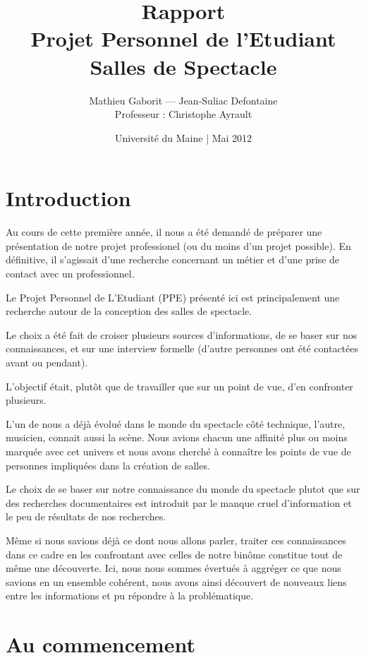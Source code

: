 \documentclass[a4paper, 11pt]{report}
\title{{\Huge Rapport}\\Projet Personnel de l'Etudiant\\
        Salles de Spectacle}
\author{Mathieu Gaborit — Jean-Suliac Defontaine\\Professeur : Christophe Ayrault}
\date{Université du Maine | Mai 2012}
\begin{document}
    \selectfont

    \maketitle
    
    \tableofcontents
    \newpage


\section*{Introduction}

Au cours de cette première année, il nous a été demandé de préparer une présentation de notre projet professionel (ou du moins d'un projet possible).
En définitive, il s'agissait d'une recherche concernant un métier et d'une prise de contact avec un professionnel.

Le Projet Personnel de L'Etudiant (PPE) présenté ici est principalement une recherche autour de la conception des salles de spectacle.

Le choix a été fait de croiser plusieurs sources d'informations, de se baser sur nos connaissances, et sur une interview formelle (d'autre personnes ont été contactées avant ou pendant).

L'objectif était, plutôt que de travailler que sur un point de vue, d'en confronter plusieurs.

L'un de nous a déjà évolué dans le monde du spectacle côté technique, l'autre, musicien, connait aussi la scène.
Nous avions chacun une affinité plus ou moins marquée avec cet univers et nous avons cherché à connaître les points de vue de personnes impliquées dans la création de salles.

Le choix de se baser sur notre connaissance du monde du spectacle plutot que sur des recherches documentaires est introduit par le manque cruel d'information et le peu de résultats de nos recherches.

Même si nous savions déjà ce dont nous allons parler, traiter ces connaissances dans ce cadre en les confrontant avec celles de notre binôme constitue tout de même une découverte.
Ici, nous nous sommes évertués à aggréger ce que nous savions en un ensemble cohérent, nous avons ainsi découvert de nouveaux liens entre les informations et pu répondre à la problématique.

\section{Au commencement}
\end{document}
